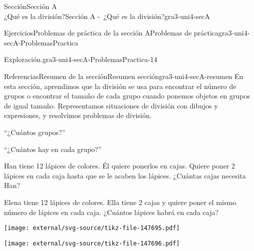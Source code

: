 \begin{sectionptx}{Sección}{{\Large Sección A\\}¿Qué es la división?}{}{Sección A -~¿Qué es la división?}{}{}{gra3-uni4-secA}
\begin{exercises-subsection}{Ejercicios}{Problemas de práctica de la sección A}{}{Problemas de práctica}{}{}{gra3-uni4-secA-ProblemasPractica}
\begin{divisionexercise}{12}{Exploración.}{}{gra3-uni4-secA-ProblemasPractica-14}
\end{divisionexercise}%
\end{exercises-subsection}
%
%
\typeout{************************************************}
\typeout{************************************************}
%
\begin{references-subsection}{Referencias}{Resumen de la sección}{}{Resumen sección}{}{}{gra3-uni4-secA-resumen}
En esta sección, aprendimos que la división se usa para encontrar el número de grupos o encontrar el tamaño de cada grupo cuando ponemos objetos en grupos de igual tamaño. Representamos situaciones de división con dibujos y expresiones, y resolvimos problemas de división.%
\begin{sidebyside}{2}{0.025}{0.025}{0.05}%
\begin{sbspanel}{0.45}%
``¿Cuántos grupos?''%
\end{sbspanel}%
\begin{sbspanel}{0.45}%
\par
``¿Cuántos hay en cada grupo?''%
\end{sbspanel}%
\end{sidebyside}%
\begin{sidebyside}{2}{0.025}{0.025}{0.05}%
\begin{sbspanel}{0.45}%
Han tiene 12 lápices de colores. Él quiere ponerlos en cajas. Quiere poner 2 lápices en cada caja hasta que se le acaben los lápices. ¿Cuántas cajas necesita Han?%
\end{sbspanel}%
\begin{sbspanel}{0.45}%
\par
Elena tiene 12 lápices de colores. Ella tiene 2 cajas y quiere poner el mismo número de lápices en cada caja. ¿Cuántos lápices habrá en cada caja?%
\end{sbspanel}%
\end{sidebyside}%
\begin{sidebyside}{2}{0.025}{0.025}{0.05}%
\begin{sbspanel}{0.45}%
\texttt{[image: external/svg-source/tikz-file-147695.pdf]}
\end{sbspanel}%
\begin{sbspanel}{0.45}%
\texttt{[image: external/svg-source/tikz-file-147696.pdf]}
\end{sbspanel}%
\end{sidebyside}%
\begin{sidebyside}{2}{0.025}{0.025}{0.05}%
\begin{sbspanel}{0.45}%

\end{sbspanel}
\end{sidebyside}
\end{references-subsection}
\end{sectionptx}
